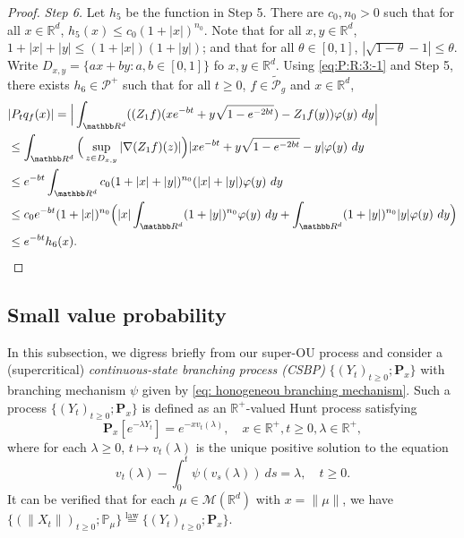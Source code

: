 \documentclass[EJP]{ejpecp} %
\begin{document}
\begin{proof}
	\emph{Step 6.} Let $h_5$ be the function in Step 5. 
	There are $c_0, n_0> 0$ such that for all $x\in \mathbb R^d$, $h_5(x) \leq c_0(1+|x|)^{n_0}$.
  	Note that for all $x, y \in \mathbb R^d$, $1+|x|+|y|\leq (1+|x|) (1+|y|)$; and that for all $\theta \in [0,1]$, $|\sqrt {1 - \theta} - 1| \leq \theta$.
  	Write $D_{x,y} = \{ax+by: a, b \in [0,1]\}$ fo $x, y \in \mathbb R^d$.
  	Using \eqref{eq:P:R:3:-1} and Step 5, there exists  $h_6 \in \mathcal P^+$ such that for all $t \geq 0$, $f \in \widetilde {\mathcal P}_g$ and $x \in \mathbb R^d$,
\begin{align}
    & |P_t q_f(x)|
    = \Big| \int_{\mathbb R^d} ( (Z_1f)(x e^{-bt}+ y \sqrt{1 - e^{-2bt}}) - Z_1 f (y) ) \varphi(y) ~dy \Big| \\
    & \leq \int_{\mathbb R^d} \Big(\sup_{z\in D_{x,y}} |\nabla  (Z_1f) (z) |\Big) | x e^{-bt} + y \sqrt{1 - e^{-2bt}} - y | \varphi(y) ~dy \\
    & \leq e^{-bt} \int_{\mathbb R^d} c_0(1+|x|+|y|)^{n_0} (|x|+|y|) \varphi(y) ~dy \\
    & \leq c_0 e^{-bt}(1+|x|)^{n_0}\Big(|x|\int_{\mathbb R^d} (1+|y|)^{n_0}\varphi(y) ~dy + \int_{\mathbb R^d} (1+ |y|)^{n_0} |y| \varphi(y) ~dy \Big) \\
    & \leq e^{-bt} h_6(x).
\qedhere
\end{align}
\end{proof}

\subsection{Small value probability}
\label{sec: Small value probability}
	In this subsection, we digress briefly from our super-OU process and consider a (supercritical) \emph{continuous-state branching process (CSBP)} $\{(Y_t)_{t\geq 0}; \mathbf P_x\}$ with branching mechanism $\psi$ given by \eqref{eq: honogeneou branching mechanism}.
	Such a process $\{(Y_t)_{t\geq 0}; \mathbf P_x\}$ is defined as an $\mathbb R^+$-valued Hunt process satisfying
\[
	\mathbf P_x[e^{-\lambda Y_t}] = e^{- x v_t(\lambda)},
	\quad x\in \mathbb R^+, t\geq 0, \lambda \in \mathbb R^+,
\]
	where for each $\lambda\geq 0$, $t\mapsto v_t(\lambda)$ is the unique positive solution to the equation
\begin{equation}
	\label{eq: fkpp equation for CSBP}
	v_t(\lambda) - \int_0^t \psi(v_s(\lambda))~ds = \lambda,
	\quad t\geq 0.
\end{equation}
	It can be verified that for each $\mu \in \mathcal M(\mathbb R^d)$ with $x = \| \mu \|$, we have $ \{(\|X_t\|)_{t\geq 0}; \mathbb P_\mu\} \overset{\text{law}}{=} \{(Y_t)_{t\geq 0}; \mathbf P_x\}$.
\end{document}
